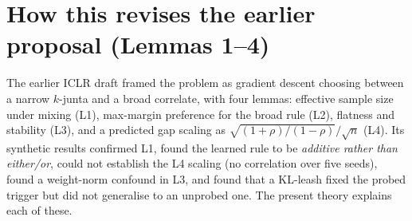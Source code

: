 \documentclass[11pt]{article}
\theoremstyle{definition}
\theoremstyle{remark}
\newcommand{\1}{\mathbf{1}}
\begin{document}
\section{How this revises the earlier proposal (Lemmas 1--4)}\label{sec:proposal}
The earlier ICLR draft framed the problem as gradient descent choosing between a narrow $k$-junta and a broad correlate, with four lemmas: effective sample size under mixing (L1), max-margin preference for the broad rule (L2), flatness and stability (L3), and a predicted gap scaling as $\sqrt{(1+\rho)/(1-\rho)}/\sqrt n$ (L4). Its synthetic results confirmed L1, found the learned rule to be \emph{additive rather than either/or}, could not establish the L4 scaling (no correlation over five seeds), found a weight-norm confound in L3, and found that a KL-leash fixed the probed trigger but did not generalise to an unprobed one. The present theory explains each of these.
\end{document}
